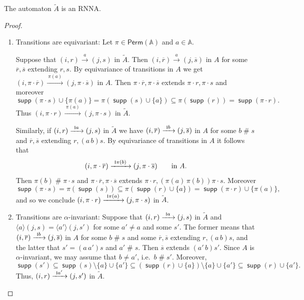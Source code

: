 \documentclass[10pt,a4paper]{amsart}
\newcommand{\scriptmidmid}{\hspace{0.2ex}{\rule[-0.1ex]{0.6pt}{1.1ex}}\hspace{0.2ex}}
\newcommand{\scriptnew}[1]{{\scriptmidmid}#1}
\numberwithin{equation}{section}
\newcommand{\ol}{\overline}
\newcommand{\xto}[1]{\xrightarrow{~#1~}}
\newcommand{\seq}{\subseteq}
\newcommand{\tl}{\widetilde}
\newcommand{\Perm}{\mathsf{Perm}}
\newcommand{\braket}[1]{\langle #1 \rangle}
\newcommand{\+}[1]{\mathcal{#1}\xspace}
\newcommand{\names}{\mathbb{A}}
\DeclareMathOperator{\supp}{\mathsf{supp}} %
\newcommand{\fresh}{\mathbin{\#}}
\theoremstyle{definition}
\begin{document}
%
\begin{lemma}
  The automaton $\tl{A}$ is an RNNA.
\end{lemma}
%
\begin{proof}
  \begin{enumerate}
  \item Transitions are equivariant: Let $\pi\in \Perm(\names)$ and
    $a\in \names$.

    Suppose that $(i,r)\xto{a} (j,s)$ in $\tl{A}$. Then
    $(i,\ol{r})\xto{a} (j,\ol{s})$ in $A$ for some $\ol{r}, \ol{s}$
    extending $r,s$. By equivariance of transitions in $A$ we get
    $(i,\pi\cdot \ol{r})\xto{\pi(a)} (j,\pi\cdot \ol{s})$ in $A$. Then
    $\pi\cdot \ol{r},\pi\cdot \ol{s}$ extends
    $\pi\cdot {r}, \pi \cdot s$ and moreover
    \[
      \supp(\pi\cdot s)\cup \{\pi(a)\}
      =
      \pi(\supp(s)\cup \{a\})
      \seq
      \pi(\supp(r))
      =
      \supp(\pi\cdot r).
    \]
    Thus $(i,\pi\cdot {r})\xto{\pi(a)} (j,\pi\cdot {s})$ in $\tl{A}$.

    Similarly, if $(i,r)\xto{\scriptnew a} (j,s)$ in $\tl{A}$ we have
    $(i,\ol{r})\xto{\scriptnew b} (j,\ol{s})$ in $A$ for some $b\fresh s$ and
    $\ol{r}, \ol{s}$ extending $r, (a\, b) s$. By equivariance of
    transitions in $A$ it follows that
    \[
      (i,\pi\cdot \ol{r})\xto{\scriptnew \pi(b)} (j,\pi\cdot \ol{s})
      \qquad\text{in $A$.}
    \]
    Then $\pi(b)\fresh \pi\cdot s$ and
    $\pi\cdot \ol{r},\pi\cdot \ol{s}$ extends
    $\pi\cdot {r}, (\pi(a)\, \pi(b)) \pi\cdot s$. Moreover
    \[
      \supp(\pi\cdot s)
      =
      \pi(\supp(s)) \seq \pi(\supp(r)\cup \{a\})
      =
      \supp(\pi\cdot r)\cup \{\pi(a)\},
    \]
    and so we conclude
    $(i,\pi\cdot {r})\xto{\scriptnew \pi(a)} (j,\pi\cdot {s})$ in $\tl{A}$.

  \item Transitions are $\alpha$-invariant: Suppose that
    $(i,r)\xto{\scriptnew a} (j,s)$ in $\tl{A}$ and
    $\braket{a} (j,s)=\braket{a'} (j,s')$ for some $a'\neq a$ and some
    $s'$. The former means that $(i,\ol{r})\xto{\scriptnew b} (j,\ol{s})$ in $A$
    for some $b\fresh s$ and some $\ol{r},\ol{s}$ extending
    $r,(a\,b)s$, and the latter that $s'=(a\, a')s$ and $a'\fresh
    s$. Then $\ol {s}$ extends $(a'\, b)s'$. Since $A$ is
    $\alpha$-invariant, we may assume that $b\neq a'$, i.e.\
    $b\fresh s'$. Moreover,
    \[
      \supp(s')
      \seq
      \supp(s)\setminus \{a\}\cup \{a'\}
      \seq
      (\supp(r)\cup \{a\})\setminus \{a\} \cup \{a'\}
      \seq
      \supp(r)\cup \{a'\}.
    \]
    Thus, $(i,r)\xto{\scriptnew a'} (j,s')$ in $\tl{A}$.
  

\end{enumerate}
\end{proof}
\end{document}
